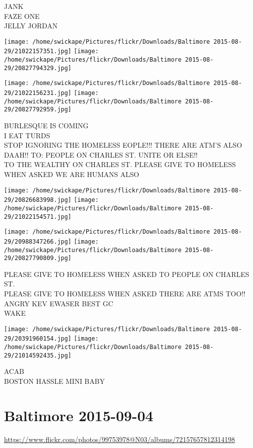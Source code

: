 \documentclass[10pt,letterpaper]{article}
\begin{document}
JANK\\
FAZE ONE\\
JELLY JORDAN
\pagebreak

\texttt{[image: /home/swickape/Pictures/flickr/Downloads/Baltimore 2015-08-29/21022157351.jpg]}
\texttt{[image: /home/swickape/Pictures/flickr/Downloads/Baltimore 2015-08-29/20827794329.jpg]}

\texttt{[image: /home/swickape/Pictures/flickr/Downloads/Baltimore 2015-08-29/21022156231.jpg]}
\texttt{[image: /home/swickape/Pictures/flickr/Downloads/Baltimore 2015-08-29/20827792959.jpg]}

BURLESQUE IS COMING\\
I EAT TURDS\\
STOP IGNORING THE HOMELESS EOPLE!!! THERE ARE ATM'S ALSO DAAH!! TO: PEOPLE ON CHARLES ST. UNITE OR ELSE!!\\
TO THE WEALTHY ON CHARLES ST.  PLEASE GIVE TO HOMELESS WHEN ASKED WE ARE HUMANS ALSO
\pagebreak

\texttt{[image: /home/swickape/Pictures/flickr/Downloads/Baltimore 2015-08-29/20826683998.jpg]}
\texttt{[image: /home/swickape/Pictures/flickr/Downloads/Baltimore 2015-08-29/21022154571.jpg]}

\texttt{[image: /home/swickape/Pictures/flickr/Downloads/Baltimore 2015-08-29/20988347266.jpg]}
\texttt{[image: /home/swickape/Pictures/flickr/Downloads/Baltimore 2015-08-29/20827790809.jpg]}

PLEASE GIVE TO HOMELESS WHEN ASKED TO PEOPLE ON CHARLES ST.\\
PLEASE GIVE TO HOMELESS WHEN ASKED THERE ARE ATMS TOO!!\\
ANGRY KEV EWASER BEST GC\\
WAKE
\pagebreak

\texttt{[image: /home/swickape/Pictures/flickr/Downloads/Baltimore 2015-08-29/20391960154.jpg]}
\texttt{[image: /home/swickape/Pictures/flickr/Downloads/Baltimore 2015-08-29/21014592435.jpg]}

ACAB\\
BOSTON HASSLE MINI BABY
\pagebreak

\section*{Baltimore 2015-09-04}

\url{https://www.flickr.com/photos/99753978@N03/albums/72157657812314198}
\end{document}
